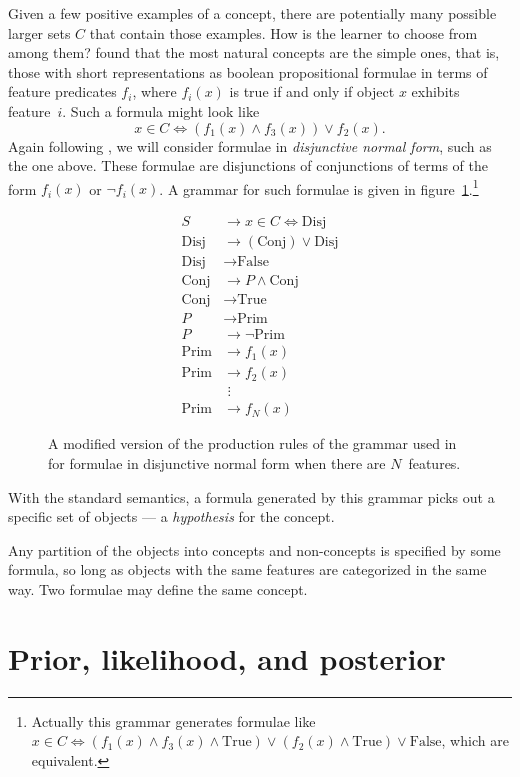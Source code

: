 \documentclass[apacite,jou]{apa6}
\newcommand{\Disj}{\text{Disj}}
\newcommand{\Conj}{\text{Conj}}
\newcommand{\True}{\text{True}}
\newcommand{\Prim}{\text{Prim}}
\newcommand{\False}{\text{False}}
\begin{document}
Given a few positive examples of a concept, there are potentially
many possible larger sets $C$ that contain those examples. How is the
learner to choose from among them? \citet{feldman} found that the most
natural concepts are the simple ones, that is, those with short
representations as boolean propositional formulae in terms of feature
predicates $f_i$, where $f_i(x)$ is true if and only if object $x$
exhibits feature~$i$. Such a formula might look like
\[ x\in C \Leftrightarrow(f_1(x)\wedge f_3(x)) \vee f_2(x).  \]
Again following \citet{rrdnf}, we will consider formulae in
\emph{disjunctive normal form}, such as the one above.
 These formulae are disjunctions
of conjunctions of terms of the form $f_i(x)$ or $\neg f_i(x)$.
A grammar for such formulae is given in 
figure~\ref{dnf1}.\footnote{Actually this grammar generates formulae like
$ x\in C \Leftrightarrow
(f_1(x)\wedge f_3(x)\wedge\True) \vee (f_2(x)\wedge\True)\vee\False$,
which are equivalent.}
\begin{figure}
\begin{align*}
	S &\to x\in C \Leftrightarrow \Disj\\
	\Disj &\to (\Conj) \vee \Disj \\
	\Disj &\to \False \\
	\Conj &\to P \wedge \Conj\\
	\Conj &\to \True\\
	P &\to \Prim\\
	P &\to \neg\Prim\\
	\Prim &\to f_1(x)\\
	\Prim &\to f_2(x)\\
	&\,\,\vdots\\
	\Prim &\to f_N(x)
\end{align*}
	\caption{A modified version
		of the production rules of the
		grammar used in \citet{rrdnf}
		 for formulae in disjunctive normal form
		when there are $N$~features.}
	\label{dnf1}
\end{figure}
With the standard semantics, a formula generated by this grammar
picks out a specific set of objects --- a \emph{hypothesis}
for the concept.

Any partition of the objects into concepts and non-concepts
is specified by some formula, so long as objects with the same 
features are categorized in the same way. Two formulae may define the
same concept.

\section{Prior, likelihood, and posterior}
\end{document}
